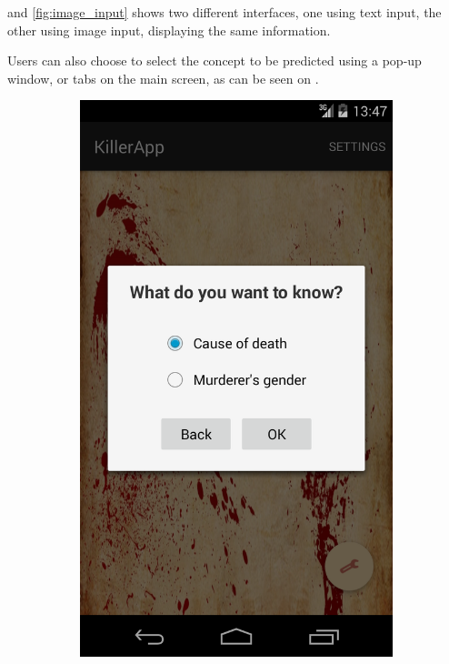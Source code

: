 \documentclass{mproj}
\begin{document}
 and \ref{fig:image_input} shows two different interfaces, one using text input, the other using image input,  displaying the same information.

Users can also choose to select the concept to be predicted using a pop-up window, or tabs on the main screen, as can be seen on .

\begin{figure}[h]
	\centering
	\begin{subfigure}{0.3\textwidth}
		\includegraphics[width=\textwidth]{images/class_dialog}		

\end{subfigure}
\end{figure}
\end{document}
